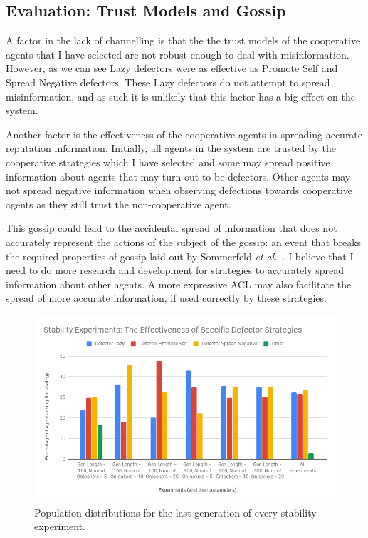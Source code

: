 \documentclass[]{final_report}
\begin{document}
\subsection{Evaluation: Trust Models and Gossip}
A factor in the lack of channelling is that the the trust models of the cooperative agents that I have selected are not robust enough to deal with misinformation. However, as we can see Lazy defectors were as effective as Promote Self and Spread Negative defectors. These Lazy defectors do not attempt to spread misinformation, and as such it is unlikely that this factor has a big effect on the system.\par 
Another factor is the effectiveness of the cooperative agents in spreading accurate reputation information. Initially, all agents in the system are trusted by the cooperative strategies which I have selected and some may spread positive information about agents that may turn out to be defectors. Other agents may not spread negative information when observing defections towards cooperative agents as they still trust the non-cooperative agent.\par 
This gossip could lead to the accidental spread of information that does not accurately represent the actions of the subject of the gossip: an event that breaks the required properties of gossip laid out by Sommerfeld \textit{et al.}~\cite{gossip_alt}. I believe that I need to do more research and development for strategies to accurately spread information about other agents. A more expressive ACL may also facilitate the spread of more accurate information, if used correctly by these strategies.
\begin{figure}
\begin{framed}
	\includegraphics[width=\textwidth]{defectorEffectiveness.png}
	\caption{Population distributions for the last generation of every stability experiment.}
	\label{fig:defectorEffectiveness}
\end{framed}
\end{figure}
\end{document}
